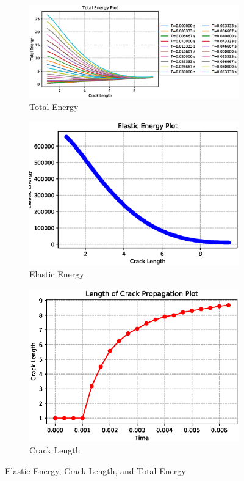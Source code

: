 \documentclass[a4paper,11pt]{article}
\begin{document}
\begin{figure}[h!]
	\begin{subfigure}[b]{\linewidth}
		\centering
		\includegraphics[width=\linewidth]{picture/conference/totalenergy}
		\caption{Total Energy}
		\label{fig:totalenergy}
	\end{subfigure}
	\quad
	\begin{subfigure}[b]{0.49\linewidth}
		\centering
		\includegraphics[width=\linewidth]{picture/conference/elastic}
		\caption{Elastic Energy}
		\label{fig:elastic}
	\end{subfigure}
	\quad
	\begin{subfigure}[b]{0.49\linewidth}
		\centering
		\includegraphics[width=\linewidth]{picture/conference/cracklength}
		\caption{Crack Length}
		\label{fig:cracklength}
	\end{subfigure}
	\caption{Elastic Energy, Crack Length, and Total Energy}
	\label{fig:crackresult}
\end{figure}
\end{document}
